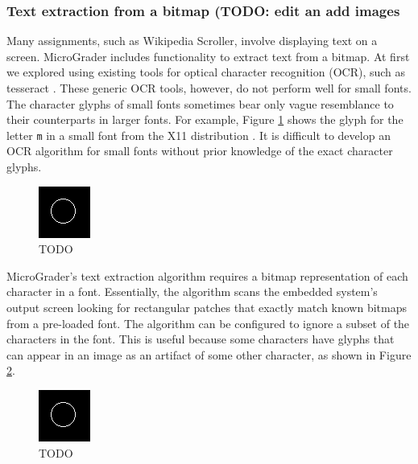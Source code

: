 \documentclass[12pt]{article}
\begin{document}
\subsubsection{Text extraction from a bitmap (TODO: edit an add images}
Many assignments, such as Wikipedia Scroller, involve displaying text on a screen.  MicroGrader includes functionality to extract text from a bitmap.  At first we explored using existing tools for optical character recognition (OCR), such as tesseract \cite{tesseract}.  These generic OCR tools, however, do not perform well for small fonts.  The character glyphs of small fonts sometimes bear only vague resemblance to their counterparts in larger fonts.  For example, Figure \ref{fig:small-glyph} shows the glyph for the letter \texttt{m} in a small font from the X11 distribution \cite{5x7}.  It is difficult to develop an OCR algorithm for small fonts without prior knowledge of the exact character glyphs.


\begin{figure}
\centering
\includegraphics[width=0.3\linewidth]{circle-left.png}
\caption{TODO}
\label{fig:small-glyph}
\end{figure}

MicroGrader's text extraction algorithm requires a bitmap representation of each character in a font.  Essentially, the algorithm scans the embedded system's output screen looking for rectangular patches that exactly match known bitmaps from a pre-loaded font.  The algorithm can be configured to ignore a subset of the characters in the font.  This is useful because some characters have glyphs that can appear in an image as an artifact of some other character, as shown in Figure \ref{fig:bad-ocr}.

\begin{figure}
\centering
\includegraphics[width=0.3\linewidth]{circle-left.png}
\caption{TODO}
\label{fig:bad-ocr}
\end{figure}
\end{document}

